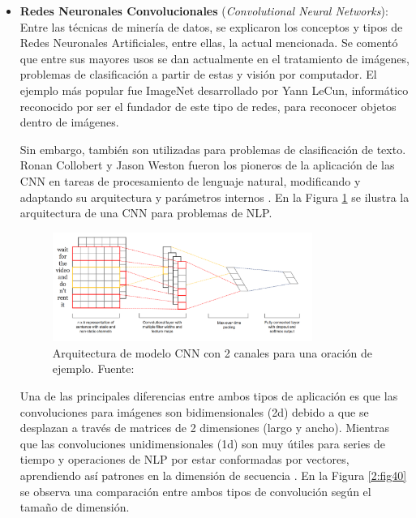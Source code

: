 \begin{itemize}
	\item \textbf{Redes Neuronales Convolucionales} (\textit{Convolutional Neural Networks}): Entre las técnicas de minería de datos, se explicaron los conceptos y tipos de Redes Neuronales Artificiales, entre ellas, la actual mencionada. Se comentó que entre sus mayores usos se dan actualmente en el tratamiento de imágenes, problemas de clasificación a partir de estas y visión por computador. El ejemplo más popular fue ImageNet desarrollado por Yann LeCun, informático reconocido por ser el fundador de este tipo de redes, para reconocer objetos dentro de imágenes.
	
	Sin embargo, también son utilizadas para problemas de clasificación de texto. Ronan Collobert y Jason Weston fueron los pioneros de la aplicación de las CNN en tareas de procesamiento de lenguaje natural, modificando y adaptando su arquitectura y parámetros internos \parencite{bk_kamath2019deeplearning_nlp_sr}. En la Figura \ref{2:fig39} se ilustra la arquitectura de una CNN para problemas de NLP.
	\begin{figure}[!ht]
		\begin{center}
			\includegraphics[width=0.8\textwidth]{2/figures/cnn_nlp.png}
			\caption[Arquitectura de modelo CNN con 2 canales para una oración de ejemplo]{Arquitectura de modelo CNN con 2 canales para una oración de ejemplo. Fuente: \cite{tec_kim2014convolutional}}
			\label{2:fig39}
		\end{center}
	\end{figure}
	
	Una de las principales diferencias entre ambos tipos de aplicación es que las convoluciones para imágenes son bidimensionales (2d) debido a que se desplazan a través de matrices de 2 dimensiones (largo y ancho). Mientras que las convoluciones unidimensionales (1d) son muy útiles para series de tiempo y operaciones de NLP por estar conformadas por vectores, aprendiendo así patrones en la dimensión de secuencia \parencite{bk_rao2019nlp_pytorch}. En la Figura \ref{2:fig40} se observa una comparación entre ambos tipos de convolución según el tamaño de dimensión.


\end{itemize}
